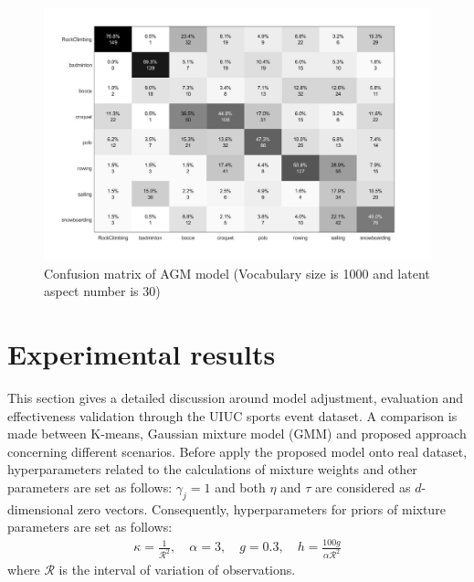 \documentclass[conference]{IEEEtran}
\begin{document}
\begin{figure}[b]
\centering
\includegraphics[width=0.42\paperwidth]{ConfMtx.jpg}
\caption{Confusion matrix of AGM model (Vocabulary size is 1000 and latent aspect number is 30)}
\label{fig:4}
\end{figure}
\section{Experimental results}
This section gives a detailed discussion around model adjustment, evaluation and effectiveness validation through the UIUC sports event dataset. A comparison is made between K-means, Gaussian mixture model (GMM) and proposed approach concerning different scenarios. Before apply the proposed model onto real dataset, hyperparameters related to the calculations of mixture weights and other parameters are set as follows: $\gamma_j = 1$ and both $\eta$ and $\tau$ are considered as $d$-dimensional zero vectors. Consequently, hyperparameters for priors of mixture parameters are set as follows\cite{Stephens2000}:
\begin{align}
\kappa = \frac{1}{\mathcal{R}^2}, \quad \alpha = 3, \quad g=0.3, \quad h=\frac{100g}{\alpha\mathcal{R}^2}
\label{eq:hypers}
\end{align}
where $\mathcal{R}$ is the interval of variation of observations.
\end{document}
